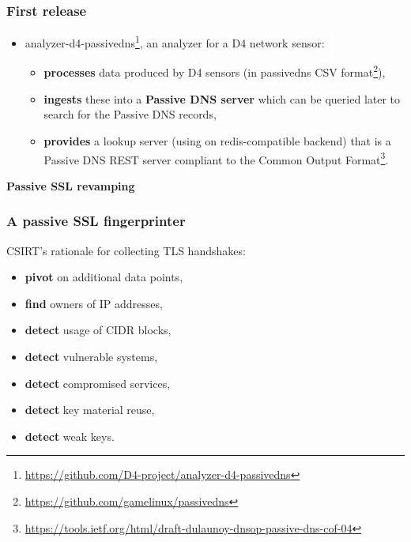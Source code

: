 \documentclass{beamer}
\begin{document}
\begin{frame}
        \frametitle{First release}

 \begin{itemize}
         \item[\checkmark]
           analyzer-d4-passivedns\footnote{\url{https://github.com/D4-project/analyzer-d4-passivedns}}, an analyzer for a D4 network sensor:

           \begin{itemize}
           \item {\bf processes} data produced by D4 sensors (in passivedns CSV format\footnote{\url{https://github.com/gamelinux/passivedns}}),
           
         \item{\bf ingests} these into a {\bf Passive DNS server} which can be queried later to search for the Passive DNS records,

         \item{\bf provides} a lookup server (using on
           redis-compatible backend) that is a Passive DNS REST server compliant to the Common Output Format\footnote{\url{https://tools.ietf.org/html/draft-dulaunoy-dnsop-passive-dns-cof-04}}.
         \end{itemize}
\end{itemize}
\end{frame}

\begin{frame}
  \begin{center}
    {\bf Passive SSL revamping}
  \end{center}
\end{frame}
       
\begin{frame}
        \frametitle{A passive SSL fingerprinter}
        CSIRT's rationale for collecting TLS handshakes:
        \begin{itemize}
          \item {\bf pivot} on additional data points,
          \item {\bf find} owners of IP addresses,
          \item {\bf detect} usage of CIDR blocks,
          \item {\bf detect} vulnerable systems,
          \item {\bf detect} compromised services,
          \item {\bf detect} key material reuse,
          \item {\bf detect} weak keys.
          \end{itemize}
\end{frame}
\end{document}
